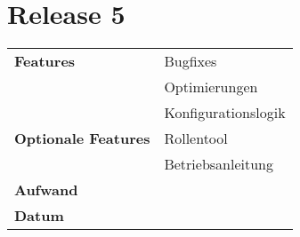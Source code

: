 \section*{Release 5}
\label{sec:release_5}

\begin{tabular}{p{5cm} p{9cm}}
    \textbf{Features} &  Bugfixes \\
    & Optimierungen \\
    & Konfigurationslogik \\
    \textbf{Optionale Features} &  Rollentool \\
    & Betriebsanleitung \\
    \hline
    \textbf{Aufwand} & \\
    \hline
    \textbf{Datum} & 
\end{tabular}
